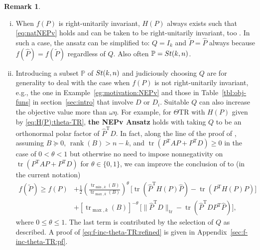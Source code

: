\documentclass[11pt]{article}
\def\bbP{\mathbb{P}}
\def\wtd{\widetilde}
\def\what{\widehat}
\newcommand\STM[2]{{\rm St}(#1,#2)}
\DeclareMathOperator{\diag}{diag}
\DeclareMathOperator{\rank}{rank}
\DeclareMathOperator{\tr}{tr}
\DeclareMathOperator{\T}{T}
\theoremstyle{definition}
\newtheorem{remark}{Remark}[section]
\numberwithin{equation}{section}
\begin{document}
\begin{remark}
\begin{enumerate}[(i)]
  \item When $f(P)$ is right-unitarily invariant, $H(P)$ always exists such that \eqref{eq:natNEPv} holds and can be taken to be right-unitarily invariant, too \cite[Lemma 2.1]{luli:2024}.
        In such a case, the ansatz %
        can be simplified to: $Q=I_k$ and $\wtd P=\what P$ always because $f(\what P)=f(\wtd P)$
        regardless of $Q$. Also often $\bbP=\STM{k}{n}$.


  \item Introducing a subset $\bbP$ of $\STM{k}{n}$ and judiciously choosing  $Q$
        are for generality to deal with the case when $f(P)$
        is not right-unitarily invariant, e.g., the one in Example~\ref{eg:motivation:NEPv} and those in Table~\ref{tbl:obj-funs} in section~\ref{sec:intro} that involve
        $D$ or $D_i$. Suitable $Q$ can also increase the objective value  more than $\omega\eta$.
        For example, for $\Theta$TR with $H(P)$ given
        by \eqref{eq:H(P):theta-TR}, {\bf the NEPv Ansatz} holds with taking
        $Q$ to be an orthonormal polar factor of $\what P^{\T}D$. In fact, along the line of the proof of
        \cite[Lemma 2.1]{wazl:2023},
        assuming $B\succeq 0$, $\rank(B)>n-k$, and $\tr(P^{\T}AP+P^{\T}D)\ge 0$ in the case of $0<\theta<1$ but otherwise
        no need to impose nonnegativity  on $\tr(P^{\T}AP+P^{\T}D)$ for $\theta\in\{0,1\}$,
        we can improve the conclusion of \cite[Theorem 2.2]{wazl:2023}  to (in the current notation)
        \begin{align}
        f(\wtd P) \ge f(P)&+\frac 12\left(\frac {\tr_{\min,k}(B)}{\tr_{\max,k}(B)}\right)^{\theta}\,\Big[\tr(\what P^{\T}H(P)\what P)-\tr(P^{\T}H(P)P)\Big] \nonumber\\
               &+[\tr_{\max,k}(B)]^{-\theta}\,\Big[\|\what P^{\T}D\|_{\tr}-\tr(\what P^{\T}DP^{\T}\what P)\Big],
                   \label{eq:f-inc-theta-TR:refined}
        \end{align}
        where $0\le\theta\le 1$.
        The last term is contributed by
        the selection of $Q$ as described.
        A proof of \eqref{eq:f-inc-theta-TR:refined} is given in Appendix~\ref{sec:f-inc-theta-TR:pf}.


\end{enumerate}
\end{remark}
\end{document}
